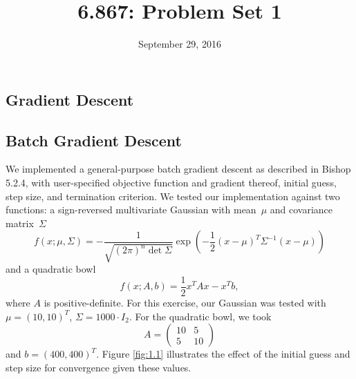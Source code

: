 \documentclass{article}
\title{6.867: Problem Set 1}
\date{September 29, 2016}
\begin{document}

\maketitle

\begin{multicols}{2}

\section{Gradient Descent}

\subsection{Batch Gradient Descent}

We implemented a general-purpose batch gradient descent as described in Bishop 5.2.4, with user-specified objective function and gradient thereof, initial guess, step size, and termination criterion. %
We tested our implementation against two functions: a sign-reversed multivariate Gaussian with mean~$\mu$ and covariance matrix~$\Sigma$
\begin{equation}
f(x; \mu, \Sigma) = -\frac{1}{\sqrt{(2\pi)^n \det\Sigma}}\exp\left( -\frac12(x - \mu)^T \Sigma^{-1}(x - \mu) \right)
\end{equation}
and a quadratic bowl
\begin{equation}
f(x; A, b) = \frac{1}{2}x^T Ax - x^T b,
\end{equation}
where $A$ is positive-definite. For this exercise, our Gaussian was tested with $\mu = (10, 10)^T$, $\Sigma = 1000 \cdot I_2$. For the quadratic bowl, we took \[A = \left(\begin{array}{cc}10 & 5 \\5 & 10\end{array}\right)\] and $b = (400, 400)^T$. Figure \ref{fig:1.1} illustrates the effect of the initial guess and step size for convergence given these values.


\end{multicols}
\end{document}
